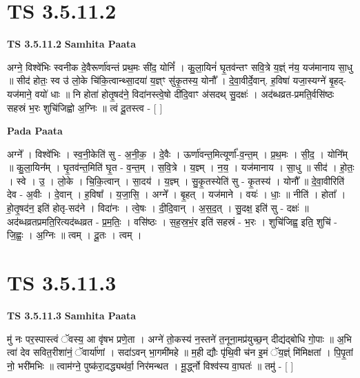 \documentclass[17pt]{extarticle}
\begin{document}
\section*{ TS 3.5.11.2 }

\textbf{TS 3.5.11.2 } \newline
\textbf{Samhita Paata} \newline

अग्ने॒ विश्वे॑भिः स्वनीक दे॒वैरूर्णा॑वन्तं प्रथ॒मः सी॑द॒ योनिं᳚ । कु॒ला॒यिनं॑ घृ॒तव॑न्तꣳ सवि॒त्रे य॒ज्ञ्ं न॑य॒ यज॑मानाय सा॒धु ॥ सीद॑ होतः॒ स्व उ॑ लो॒के चि॑कि॒त्वान्थ्सा॒दया॑ य॒ज्ञ्ꣳ सु॑कृ॒तस्य॒ योनौ᳚ । दे॒वा॒वीर्दे॒वान्. ह॒विषा॑ यजा॒स्यग्ने॑ बृ॒हद्-यज॑माने॒ वयो॑ धाः ॥ नि होता॑ होतृ॒षद॑ने॒ विदा॑नस्त्वे॒षो दी॑दि॒वाꣳ अ॑सदथ् सु॒दक्षः॑ । अद॑ब्धव्रत-प्रमति॒र्वसि॑ष्ठः सहस्रं भ॒रः शुचि॑जिह्वो अ॒ग्निः ॥ त्वं दू॒तस्त्व - [  ] \newline

\textbf{Pada Paata} \newline

अग्ने᳚ । विश्वे॑भिः । स्व॒नी॒केति॑ सु - अ॒नी॒क॒ । दे॒वैः । ऊर्णा॑वन्त॒मित्यूर्णा᳚-व॒न्त॒म् । प्र॒थ॒मः । सी॒द॒ । योनि᳚म् ॥ कु॒ला॒यिन᳚म् । घृ॒तव॑न्त॒मिति॑ घृ॒त - व॒न्त॒म् । स॒वि॒त्रे । य॒ज्ञ्म् । न॒य॒ । यज॑मानाय । सा॒धु ॥ सीद॑ । हो॒तः॒ । स्वे । उ॒ । लो॒के । चि॒कि॒त्वान् । सा॒दय॑ । य॒ज्ञ्म् । सु॒कृ॒तस्येति॑ सु - कृ॒तस्य॑ । योनौ᳚ ॥ दे॒वा॒वीरिति॑ देव - अ॒वीः । दे॒वान् । ह॒विषा᳚ । य॒जा॒सि॒ । अग्ने᳚ । बृ॒हत् । यज॑माने । वयः॑ । धाः॒ ॥ नीति॑ । होता᳚ । हो॒तृ॒षद॑न॒ इति॑ होतृ-सद॑ने । विदा॑नः । त्वे॒षः । दी॒दि॒वान् । अ॒स॒द॒त् । सु॒दक्ष॒ इति॑ सु - दक्षः॑ ॥ अद॑ब्धव्रतप्रमति॒रित्यद॑ब्धव्रत - प्र॒म॒तिः॒ । वसि॑ष्ठः । स॒ह॒स्र॒भं॒र इति॑ सहस्रं - भ॒रः । शुचि॑जिह्व॒ इति॒ शुचि॑ - जि॒ह्वः॒ । अ॒ग्निः ॥ त्वम् । दू॒तः । त्वम् ।  \newline




\section*{ TS 3.5.11.3 }

\textbf{TS 3.5.11.3 } \newline
\textbf{Samhita Paata} \newline

मु॑ नः पर॒स्पास्त्वं ॅवस्य॒ आ वृ॑षभ प्रणे॒ता । अग्ने॑ तो॒कस्य॑ न॒स्तने॑ त॒नूना॒मप्र॑युच्छ॒न् दीद्य॑द्बोधि गो॒पाः ॥ अ॒भि त्वा॑ देव सवित॒रीशा॑नं॒ ॅवार्या॑णां । सदा॑ऽवन् भा॒गमी॑महे ॥ म॒ही द्यौः पृ॑थि॒वी च॑न इ॒मं ॅय॒ज्ञ्ं मि॑मिक्षतां । पि॒पृ॒तां नो॒ भरी॑मभिः ॥ त्वाम॑ग्ने॒ पुष्क॑रा॒दद्ध्यथ॑र्वा॒ निर॑मन्थत । मू॒र्द्ध्नो विश्व॑स्य वा॒घतः॑ ॥ तमु॑ - [  ] \newline
\end{document}
